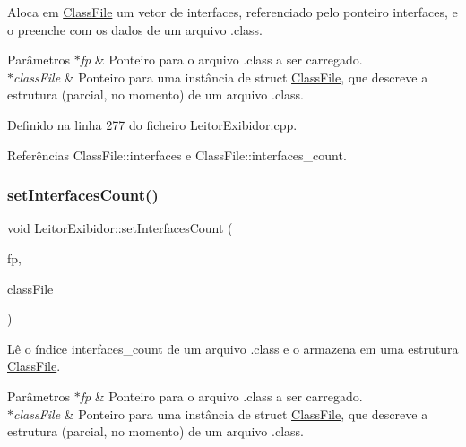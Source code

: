 Aloca em \hyperlink{classClassFile}{Class\+File} um vetor de interfaces, referenciado pelo ponteiro interfaces, e o preenche com os dados de um arquivo .class. 
\begin{DoxyParams}{Parâmetros}
{\em $\ast$fp} & Ponteiro para o arquivo .class a ser carregado. \\
\hline
{\em $\ast$class\+File} & Ponteiro para uma instância de struct \hyperlink{classClassFile}{Class\+File}, que descreve a estrutura (parcial, no momento) de um arquivo .class. \\
\hline
\end{DoxyParams}


Definido na linha 277 do ficheiro Leitor\+Exibidor.\+cpp.



Referências Class\+File\+::interfaces e Class\+File\+::interfaces\+\_\+count.

\mbox{\label{classLeitorExibidor_afbe776f3eb57a38dde0bfe862dd5650a}} 
\subsubsection{\texorpdfstring{set\+Interfaces\+Count()}{setInterfacesCount()}}
{\footnotesize\ttfamily void Leitor\+Exibidor\+::set\+Interfaces\+Count (\begin{DoxyParamCaption}\item[{F\+I\+LE $\ast$}]{fp,  }\item[{\hyperlink{classClassFile}{Class\+File} $\ast$}]{class\+File }\end{DoxyParamCaption})\hspace{0.3cm}{\ttfamily [private]}}

Lê o índice interfaces\+\_\+count de um arquivo .class e o armazena em uma estrutura \hyperlink{classClassFile}{Class\+File}. 
\begin{DoxyParams}{Parâmetros}
{\em $\ast$fp} & Ponteiro para o arquivo .class a ser carregado. \\
\hline
{\em $\ast$class\+File} & Ponteiro para uma instância de struct \hyperlink{classClassFile}{Class\+File}, que descreve a estrutura (parcial, no momento) de um arquivo .class. \\
\hline
\end{DoxyParams}


